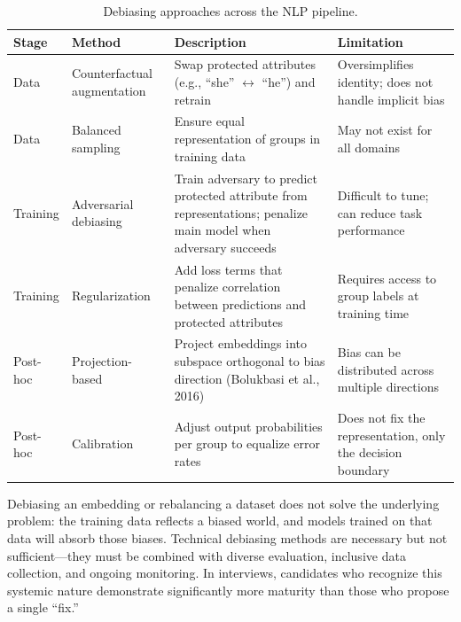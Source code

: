 \begin{table}[H]
\centering
\caption{Debiasing approaches across the NLP pipeline.}
\label{tab:debiasing}
\begin{tabularx}{\textwidth}{l l X l}
\toprule
\textbf{Stage} & \textbf{Method} & \textbf{Description} & \textbf{Limitation} \\
\midrule
Data & Counterfactual augmentation & Swap protected attributes
    (e.g., ``she'' $\leftrightarrow$ ``he'') and retrain & Oversimplifies
    identity; does not handle implicit bias \\
Data & Balanced sampling & Ensure equal representation of groups
    in training data & May not exist for all domains \\
Training & Adversarial debiasing & Train adversary to predict protected
    attribute from representations; penalize main model when adversary
    succeeds & Difficult to tune; can reduce task performance \\
Training & Regularization & Add loss terms that penalize correlation
    between predictions and protected attributes & Requires access to group
    labels at training time \\
Post-hoc & Projection-based & Project embeddings into subspace
    orthogonal to bias direction (Bolukbasi et al., 2016) & Bias can be
    distributed across multiple directions \\
Post-hoc & Calibration & Adjust output probabilities per group
    to equalize error rates & Does not fix the representation, only the
    decision boundary \\
\bottomrule
\end{tabularx}
\end{table}

\begin{keyinsight}
Debiasing an embedding or rebalancing a dataset does not solve the underlying
problem: the training data reflects a biased world, and models trained on that
data will absorb those biases.  Technical debiasing methods are necessary but
not sufficient---they must be combined with diverse evaluation, inclusive data
collection, and ongoing monitoring.  In interviews, candidates who recognize
this systemic nature demonstrate significantly more maturity than those who
propose a single ``fix.''
\end{keyinsight}

